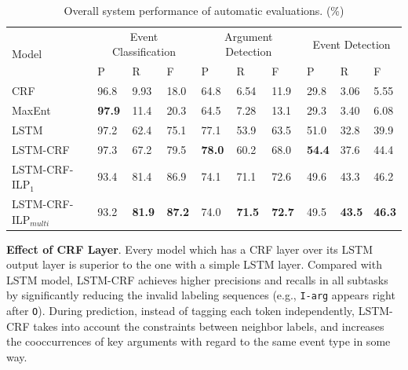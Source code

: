 \documentclass{article}
\begin{document}
\begin{table}[!t]
\centering
\small
\begin{tabular}{|l|p{0.8cm}<{\centering}|p{0.8cm}<{\centering}|p{0.8cm}<{\centering}|p{0.8cm}<{\centering}|p{0.8cm}<{\centering}|p{0.8cm}<{\centering}|p{0.8cm}<{\centering}|p{0.8cm}<{\centering}|p{0.8cm}<{\centering}|} \hline
	\multirow{2}{*}{Model} & \multicolumn{3}{c|}{Event Classification} & \multicolumn{3}{c|}{Argument Detection} &
	\multicolumn{3}{c|}{Event Detection} \\ \cline{2-10}
	 & P & R & F & P & R & F & P & R & F \\ \hline
	CRF & 96.8 & 9.93 & 18.0 & 64.8 & 6.54 & 11.9 & 29.8 & 3.06 & 5.55 \\ \hline
	MaxEnt & \textbf{97.9} & 11.4 & 20.3 & 64.5 & 7.28 & 13.1 & 29.3 & 3.40 & 6.08 \\ \hline
	LSTM & 97.2 & 62.4 & 75.1 & 77.1 & 53.9 & 63.5 & 51.0 & 32.8 & 39.9  \\ \hline \hline
	LSTM-CRF & 97.3 & 67.2 & 79.5 & \textbf{78.0} & 60.2 & 68.0  & \textbf{54.4} & 37.6 & 44.4  \\ \hline
	LSTM-CRF-ILP$_{1}$ & 93.4 & 81.4 & 86.9 & 74.1 & 71.1 & 72.6  & 49.6 & 43.3 & 46.2 \\ \hline
	LSTM-CRF-ILP$_{multi}$ & 93.2 & \textbf{81.9} & \textbf{87.2} &  74.0 & \textbf{71.5} & \textbf{72.7} & 49.5 & \textbf{43.5} & \textbf{46.3} \\ \hline
\end{tabular}
\caption{Overall system performance of automatic evaluations. (\%) \label{tab:1}}
\end{table}

\vspace{1em}
\noindent \textbf{Effect of CRF Layer}. Every model which has a CRF layer over its LSTM output layer is superior to the one with a simple LSTM layer. Compared with LSTM model, LSTM-CRF achieves higher precisions and recalls in all subtasks by significantly reducing the invalid labeling sequences (e.g., \texttt{I-arg} appears right after \texttt{O}). During prediction, instead of tagging each token independently, LSTM-CRF takes into account the constraints between neighbor labels, and increases the cooccurrences of key arguments with regard to the same event type in some way.
\end{document}
